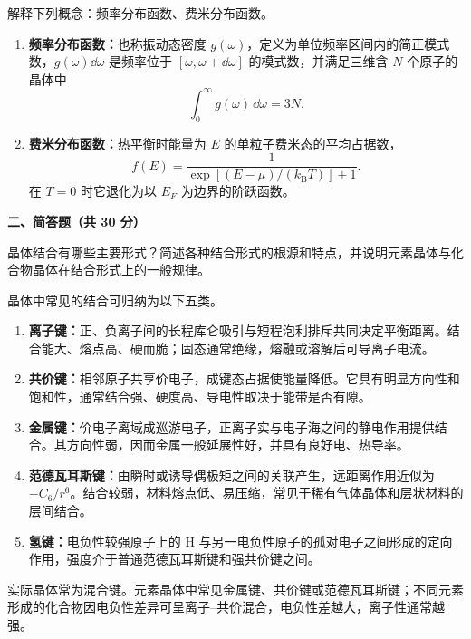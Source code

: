 \begin{question}[5 分]
解释下列概念：频率分布函数、费米分布函数。


\begin{solution}
\begin{enumerate}
  \item \textbf{频率分布函数：}也称振动态密度 $g(\omega)$，定义为单位频率区间内的简正模式数，$g(\omega)\dd\omega$ 是频率位于 $[\omega,\omega+\dd\omega]$ 的模式数，并满足三维含 $N$ 个原子的晶体中
  \[
    \int_0^\infty g(\omega)\,\dd\omega=3N.
  \]
  \item \textbf{费米分布函数：}热平衡时能量为 $E$ 的单粒子费米态的平均占据数，
  \[
    \boxed{f(E)=\frac1{\exp[(E-\mu)/(k_{\mathrm B}T)]+1}.}
  \]
  在 $T=0$ 时它退化为以 $E_F$ 为边界的阶跃函数。
\end{enumerate}
\end{solution}
\end{question}

\textbf{二、简答题（共 30 分）}

\begin{question}[10 分]
晶体结合有哪些主要形式？简述各种结合形式的根源和特点，并说明元素晶体与化合物晶体在结合形式上的一般规律。


\begin{solution}
晶体中常见的结合可归纳为以下五类。
\begin{enumerate}
  \item \textbf{离子键：}正、负离子间的长程库仑吸引与短程泡利排斥共同决定平衡距离。结合能大、熔点高、硬而脆；固态通常绝缘，熔融或溶解后可导离子电流。
  \item \textbf{共价键：}相邻原子共享价电子，成键态占据使能量降低。它具有明显方向性和饱和性，通常结合强、硬度高、导电性取决于能带是否有隙。
  \item \textbf{金属键：}价电子离域成巡游电子，正离子实与电子海之间的静电作用提供结合。其方向性弱，因而金属一般延展性好，并具有良好电、热导率。
  \item \textbf{范德瓦耳斯键：}由瞬时或诱导偶极矩之间的关联产生，远距离作用近似为 $-C_6/r^6$。结合较弱，材料熔点低、易压缩，常见于稀有气体晶体和层状材料的层间结合。
  \item \textbf{氢键：}电负性较强原子上的 H 与另一电负性原子的孤对电子之间形成的定向作用，强度介于普通范德瓦耳斯键和强共价键之间。
\end{enumerate}
实际晶体常为混合键。元素晶体中常见金属键、共价键或范德瓦耳斯键；不同元素形成的化合物因电负性差异可呈离子--共价混合，电负性差越大，离子性通常越强。
\end{solution}
\end{question}

